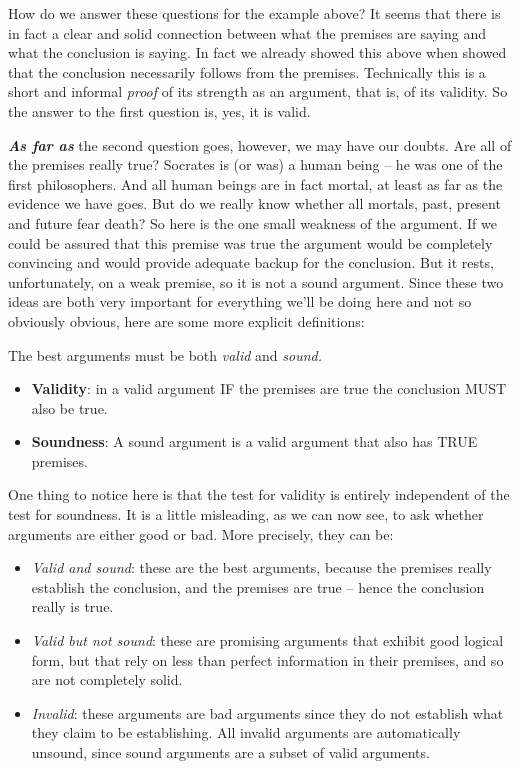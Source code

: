 \documentclass[12pt, openany]{book}
\makeatletter
\newenvironment{kframe}{%
\medskip{}
\setlength{\fboxsep}{.8em}
 \def\at@end@of@kframe{}%
 \ifinner\ifhmode%
  \def\at@end@of@kframe{\end{minipage}}%
  \begin{minipage}{\columnwidth}%
 \fi\fi%
 \def\FrameCommand##1{\hskip\@totalleftmargin \hskip-\fboxsep
 \colorbox{shadecolor}{##1}\hskip-\fboxsep
     \hskip-\linewidth \hskip-\@totalleftmargin \hskip\columnwidth}%
 \MakeFramed {\advance\hsize-\width
   \@totalleftmargin\z@ \linewidth\hsize
   \@setminipage}}%
 {\par\unskip\endMakeFramed%
 \at@end@of@kframe}
\newenvironment{rmdblock}[1]
  {
  \begin{itemize}
  \renewcommand{\labelitemi}{
    \raisebox{-.7\height}[0pt][0pt]{
      {\setkeys{Gin}{width=3em,keepaspectratio}\texttt{[image: img/\#1]}}
    }
  }
  \setlength{\fboxsep}{1em}
  \begin{kframe}
  \item
  }
  {
  \end{kframe}
  \end{itemize}
  }
\newenvironment{rmdcaution}
  {\begin{rmdblock}{caution}}
  {\end{rmdblock}}
\makeatother
\begin{document}
How do we answer these questions for the example above? It seems that there is in fact a clear and solid connection between what the premises are saying and what the conclusion is saying. In fact we already showed this above when showed that the conclusion necessarily follows from the premises. Technically this is a short and informal \emph{proof} of its strength as an argument, that is, of its validity. So the answer to the first question is, yes, it is valid.

\textbf{\emph{As far as}} the second question goes, however, we may have our doubts. Are all of the premises really true? Socrates is (or was) a human being -- he was one of the first philosophers. And all human beings are in fact mortal, at least as far as the evidence we have goes. But do we really know whether all mortals, past, present and future fear death? So here is the one small weakness of the argument. If we could be assured that this premise was true the argument would be completely convincing and would provide adequate backup for the conclusion. But it rests, unfortunately, on a weak premise, so it is not a sound argument. Since these two ideas are both very important for everything we'll be doing here and not so obviously obvious, here are some more explicit definitions:

\begin{rmdcaution}

The best arguments must be both \emph{valid} and \emph{sound.}

\begin{itemize}
\item
  \textbf{Validity}: in a valid argument IF the premises are true the conclusion MUST also be true.
\item
  \textbf{Soundness}: A sound argument is a valid argument that also has TRUE premises.
\end{itemize}

\end{rmdcaution}

One thing to notice here is that the test for validity is entirely independent of the test for soundness. It is a little misleading, as we can now see, to ask whether arguments are either good or bad. More precisely, they can be:

\begin{itemize}
\item
  \emph{Valid and sound}: these are the best arguments, because the premises really establish the conclusion, and the premises are true -- hence the conclusion really is true.
\item
  \emph{Valid but not sound}: these are promising arguments that exhibit good logical form, but that rely on less than perfect information in their premises, and so are not completely solid.
\item
  \emph{Invalid}: these arguments are bad arguments since they do not establish what they claim to be establishing. All invalid arguments are automatically unsound, since sound arguments are a subset of valid arguments.
\end{itemize}
\end{document}
